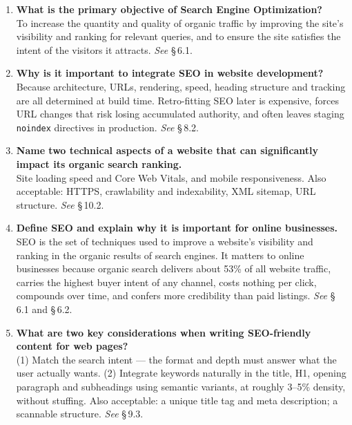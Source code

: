 \begin{enumerate}[leftmargin=2.2em,itemsep=1.1ex]
\item \textbf{What is the primary objective of Search Engine Optimization?}
      \\
      To increase the quantity and quality of organic traffic by improving the
      site's visibility and ranking for relevant queries, and to ensure the site
      satisfies the intent of the visitors it attracts. \hfill\emph{See} \S\,6.1.

\item \textbf{Why is it important to integrate SEO in website development?}
      \\
      Because architecture, URLs, rendering, speed, heading structure and
      tracking are all determined at build time. Retro-fitting SEO later is
      expensive, forces URL changes that risk losing accumulated authority, and
      often leaves staging \texttt{noindex} directives in production.
      \hfill\emph{See} \S\,8.2.

\item \textbf{Name two technical aspects of a website that can significantly
      impact its organic search ranking.}
      \\
      Site loading speed and Core Web Vitals, and mobile responsiveness. Also
      acceptable: HTTPS, crawlability and indexability, XML sitemap, URL
      structure. \hfill\emph{See} \S\,10.2.

\item \textbf{Define SEO and explain why it is important for online businesses.}
      \\
      SEO is the set of techniques used to improve a website's visibility and
      ranking in the organic results of search engines. It matters to online
      businesses because organic search delivers about 53\% of all website
      traffic, carries the highest buyer intent of any channel, costs nothing per
      click, compounds over time, and confers more credibility than paid
      listings. \hfill\emph{See} \S\,6.1 and \S\,6.2.

\item \textbf{What are two key considerations when writing SEO-friendly content
      for web pages?} \\
      (1) Match the search intent --- the format and depth must answer what the
      user actually wants. (2) Integrate keywords naturally in the title, H1,
      opening paragraph and subheadings using semantic variants, at roughly
      3--5\% density, without stuffing. Also acceptable: a unique title tag and
      meta description; a scannable structure. \hfill\emph{See} \S\,9.3.

\end{enumerate}

